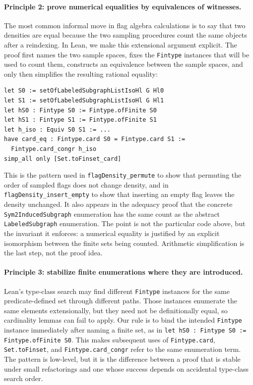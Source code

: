 \documentclass{article}
\newcommand{\lean}[1]{\texttt{#1}}
\begin{document}
\paragraph{Principle 2: prove numerical equalities by equivalences of witnesses.}
The most common informal move in flag algebra calculations is to say that two
densities are equal because the two sampling procedures count the same objects
after a reindexing.  In Lean, we make this extensional argument explicit.  The
proof first names the two sample spaces, fixes the \lean{Fintype} instances
that will be used to count them, constructs an equivalence between the sample
spaces, and only then simplifies the resulting rational equality:
\begin{lstlisting}
let S0 := setOfLabeledSubgraphListIsoHl G Hl0
let S1 := setOfLabeledSubgraphListIsoHl G Hl1
let hS0 : Fintype S0 := Fintype.ofFinite S0
let hS1 : Fintype S1 := Fintype.ofFinite S1
let h_iso : Equiv S0 S1 := ...
have card_eq : Fintype.card S0 = Fintype.card S1 :=
  Fintype.card_congr h_iso
simp_all only [Set.toFinset_card]
\end{lstlisting}
This is the pattern used in \lean{flagDensity\_permute} to show that
permuting the order of sampled flags does not change density, and in
\lean{flagDensity\_insert\_empty} to show that inserting an empty flag leaves
the density unchanged.  It also appears in the adequacy proof that the concrete
\lean{Sym2InducedSubgraph} enumeration has the same count as the abstract
\lean{LabeledSubgraph} enumeration.  The point is not the particular code
above, but the invariant it enforces: a numerical equality is justified by an
explicit isomorphism between the finite sets being counted.  Arithmetic
simplification is the last step, not the proof idea.

\paragraph{Principle 3: stabilize finite enumerations where they are introduced.}
Lean's type-class search may find different \lean{Fintype} instances for the
same predicate-defined set through different paths.  Those instances enumerate
the same elements extensionally, but they need not be definitionally equal, so
cardinality lemmas can fail to apply.  Our rule is to bind the intended
\lean{Fintype} instance immediately after naming a finite set, as in
\lean{let hS0 : Fintype S0 := Fintype.ofFinite S0}.  This makes subsequent
uses of \lean{Fintype.card}, \lean{Set.toFinset}, and
\lean{Fintype.card\_congr} refer to the same enumeration term.  The pattern is
low-level, but it is the difference between a proof that is stable under small
refactorings and one whose success depends on accidental type-class search
order.
\end{document}

